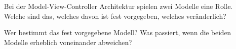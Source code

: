 \documentclass{article}
\date{10 Minuten} %
\begin{document}
	\maketitle
	
	Bei der Model-View-Controller Architektur spielen zwei Modelle eine Rolle. Welche sind das, welches davon ist fest vorgegeben, welches veränderlich?
	 
    \newpage
	Wer bestimmt das fest vorgegebene Modell? Was passiert, wenn die beiden Modelle erheblich voneinander abweichen?
	 
\end{document}
